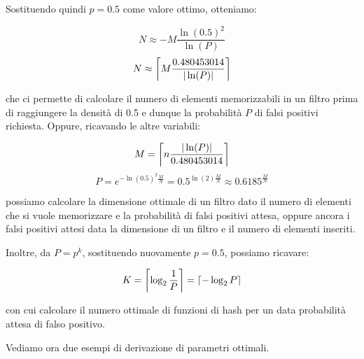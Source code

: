 Sostituendo quindi $p=0.5$ come valore ottimo, otteniamo:

$$ N \approx -M\frac{\ln(0.5)^2}{\ln(P)} $$
\begin{equation} \label{eq:bloomn}
N \approx \ceil*{M\frac{0.480453014}{|\ln(P)|}}
\end{equation}

che ci permette di calcolare il numero di elementi memorizzabili in un filtro prima di raggiungere
la densità di 0.5 e dunque la probabilità $P$ di falsi positivi richiesta. Oppure, ricavando
le altre variabili:

\begin{equation} \label{eq:bloomm}
M = \ceil*{n\frac{|\ln(P)|}{0.480453014}} 
\end{equation}
\begin{equation} \label{eq:bloomp}
P = e^{-\ln(0.5)^2\frac{M}{N}} = 0.5^{\ln(2)\frac{M}{N}} \approx 0.6185^{\frac{M}{N}}
\end{equation}

possiamo calcolare la dimensione ottimale di un filtro dato il numero di elementi che si vuole
memorizzare e la probabilità di falsi positivi attesa, oppure ancora i falsi positivi attesi
data la dimensione di un filtro e il numero di elementi inseriti. 

Inoltre, da $P = p^k$, sostituendo nuovamente $p=0.5$, possiamo ricavare:

\begin{equation} \label{eq:bloomk}
 K = \ceil*{\log_2{\frac{1}{P}}} = \ceil*{-\log_2{P}}
\end{equation}

con cui calcolare il numero ottimale di funzioni di hash per un data probabilità attesa di falso
positivo.

Vediamo ora due esempi di derivazione di parametri ottimali. 

